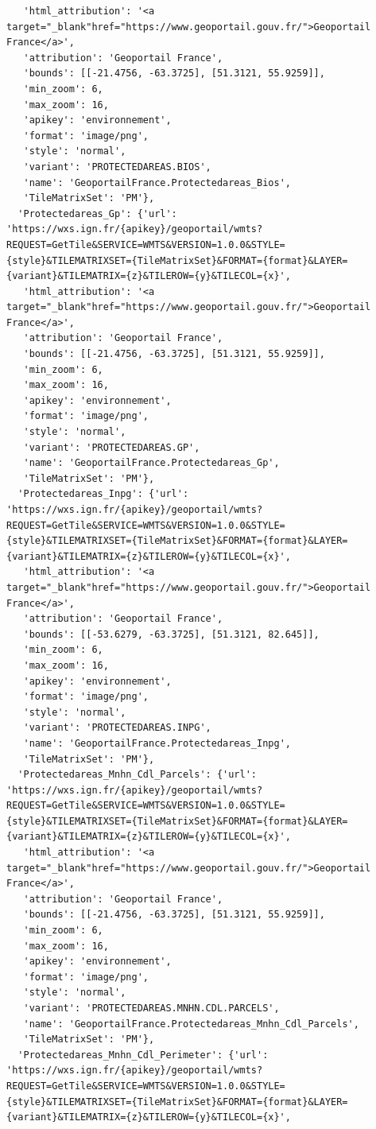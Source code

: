 \documentclass[
  letterpaper,
  DIV=11,
  numbers=noendperiod]{scrreprt}
\begin{document}
\begin{verbatim}
   'html_attribution': '<a target="_blank"href="https://www.geoportail.gouv.fr/">Geoportail France</a>',
   'attribution': 'Geoportail France',
   'bounds': [[-21.4756, -63.3725], [51.3121, 55.9259]],
   'min_zoom': 6,
   'max_zoom': 16,
   'apikey': 'environnement',
   'format': 'image/png',
   'style': 'normal',
   'variant': 'PROTECTEDAREAS.BIOS',
   'name': 'GeoportailFrance.Protectedareas_Bios',
   'TileMatrixSet': 'PM'},
  'Protectedareas_Gp': {'url': 'https://wxs.ign.fr/{apikey}/geoportail/wmts?REQUEST=GetTile&SERVICE=WMTS&VERSION=1.0.0&STYLE={style}&TILEMATRIXSET={TileMatrixSet}&FORMAT={format}&LAYER={variant}&TILEMATRIX={z}&TILEROW={y}&TILECOL={x}',
   'html_attribution': '<a target="_blank"href="https://www.geoportail.gouv.fr/">Geoportail France</a>',
   'attribution': 'Geoportail France',
   'bounds': [[-21.4756, -63.3725], [51.3121, 55.9259]],
   'min_zoom': 6,
   'max_zoom': 16,
   'apikey': 'environnement',
   'format': 'image/png',
   'style': 'normal',
   'variant': 'PROTECTEDAREAS.GP',
   'name': 'GeoportailFrance.Protectedareas_Gp',
   'TileMatrixSet': 'PM'},
  'Protectedareas_Inpg': {'url': 'https://wxs.ign.fr/{apikey}/geoportail/wmts?REQUEST=GetTile&SERVICE=WMTS&VERSION=1.0.0&STYLE={style}&TILEMATRIXSET={TileMatrixSet}&FORMAT={format}&LAYER={variant}&TILEMATRIX={z}&TILEROW={y}&TILECOL={x}',
   'html_attribution': '<a target="_blank"href="https://www.geoportail.gouv.fr/">Geoportail France</a>',
   'attribution': 'Geoportail France',
   'bounds': [[-53.6279, -63.3725], [51.3121, 82.645]],
   'min_zoom': 6,
   'max_zoom': 16,
   'apikey': 'environnement',
   'format': 'image/png',
   'style': 'normal',
   'variant': 'PROTECTEDAREAS.INPG',
   'name': 'GeoportailFrance.Protectedareas_Inpg',
   'TileMatrixSet': 'PM'},
  'Protectedareas_Mnhn_Cdl_Parcels': {'url': 'https://wxs.ign.fr/{apikey}/geoportail/wmts?REQUEST=GetTile&SERVICE=WMTS&VERSION=1.0.0&STYLE={style}&TILEMATRIXSET={TileMatrixSet}&FORMAT={format}&LAYER={variant}&TILEMATRIX={z}&TILEROW={y}&TILECOL={x}',
   'html_attribution': '<a target="_blank"href="https://www.geoportail.gouv.fr/">Geoportail France</a>',
   'attribution': 'Geoportail France',
   'bounds': [[-21.4756, -63.3725], [51.3121, 55.9259]],
   'min_zoom': 6,
   'max_zoom': 16,
   'apikey': 'environnement',
   'format': 'image/png',
   'style': 'normal',
   'variant': 'PROTECTEDAREAS.MNHN.CDL.PARCELS',
   'name': 'GeoportailFrance.Protectedareas_Mnhn_Cdl_Parcels',
   'TileMatrixSet': 'PM'},
  'Protectedareas_Mnhn_Cdl_Perimeter': {'url': 'https://wxs.ign.fr/{apikey}/geoportail/wmts?REQUEST=GetTile&SERVICE=WMTS&VERSION=1.0.0&STYLE={style}&TILEMATRIXSET={TileMatrixSet}&FORMAT={format}&LAYER={variant}&TILEMATRIX={z}&TILEROW={y}&TILECOL={x}',

\end{verbatim}
\end{document}
